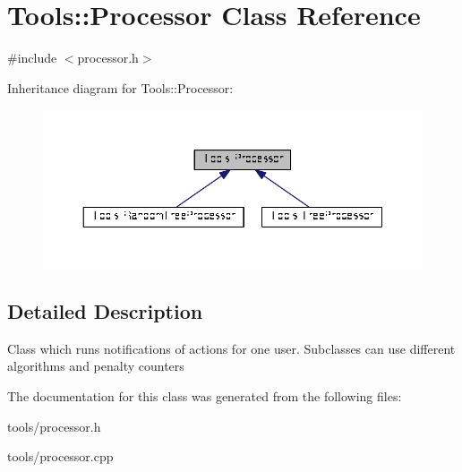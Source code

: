 \hypertarget{classTools_1_1Processor}{\section{Tools\-:\-:Processor Class Reference}
\label{classTools_1_1Processor}
}


{\ttfamily \#include $<$processor.\-h$>$}



Inheritance diagram for Tools\-:\-:Processor\-:\nopagebreak
\begin{figure}[H]
\begin{center}
\leavevmode
\includegraphics[width=350pt]{classTools_1_1Processor__inherit__graph}
\end{center}
\end{figure}


\subsection{Detailed Description}
Class which runs notifications of actions for one user. Subclasses can use different algorithms and penalty counters 

The documentation for this class was generated from the following files\-:\begin{DoxyCompactItemize}
\item 
tools/processor.\-h\item 
tools/processor.\-cpp\end{DoxyCompactItemize}
